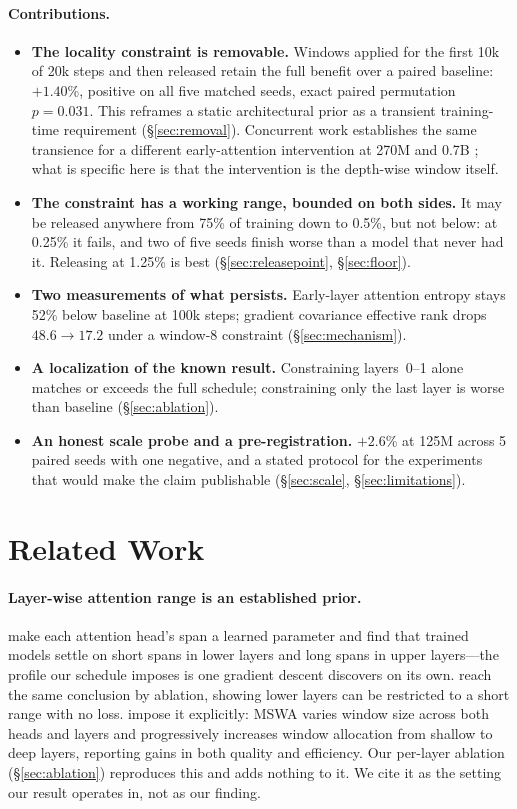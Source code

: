 \documentclass[11pt,a4paper]{article}
\begin{document}
\paragraph{Contributions.}
\begin{itemize}
    \item \textbf{The locality constraint is removable.} Windows applied for the first 10k of 20k steps and then released retain the full benefit over a paired baseline: $+1.40$\%, positive on all five matched seeds, exact paired permutation $p=0.031$. This reframes a static architectural prior as a transient training-time requirement (\S\ref{sec:removal}). Concurrent work establishes the same transience for a different early-attention intervention at 270M and 0.7B \citep{zhu2026learningless}; what is specific here is that the intervention is the depth-wise window itself.
    \item \textbf{The constraint has a working range, bounded on both sides.} It may be released anywhere from 75\% of training down to 0.5\%, but not below: at 0.25\% it fails, and two of five seeds finish worse than a model that never had it. Releasing at 1.25\% is best (\S\ref{sec:releasepoint}, \S\ref{sec:floor}).
    \item \textbf{Two measurements of what persists.} Early-layer attention entropy stays 52\% below baseline at 100k steps; gradient covariance effective rank drops $48.6 \rightarrow 17.2$ under a window-8 constraint (\S\ref{sec:mechanism}).
    \item \textbf{A localization of the known result.} Constraining layers~0--1 alone matches or exceeds the full schedule; constraining only the last layer is worse than baseline (\S\ref{sec:ablation}).
    \item \textbf{An honest scale probe and a pre-registration.} $+2.6$\% at 125M across 5 paired seeds with one negative, and a stated protocol for the experiments that would make the claim publishable (\S\ref{sec:scale}, \S\ref{sec:limitations}).
\end{itemize}

\section{Related Work}

\paragraph{Layer-wise attention range is an established prior.} \citet{sukhbaatar2019adaptive} make each attention head's span a learned parameter and find that trained models settle on short spans in lower layers and long spans in upper layers---the profile our schedule imposes is one gradient descent discovers on its own. \citet{rae2020deep} reach the same conclusion by ablation, showing lower layers can be restricted to a short range with no loss. \citet{xu2025mswa} impose it explicitly: MSWA varies window size across both heads and layers and progressively increases window allocation from shallow to deep layers, reporting gains in both quality and efficiency. Our per-layer ablation (\S\ref{sec:ablation}) reproduces this and adds nothing to it. We cite it as the setting our result operates in, not as our finding.
\end{document}

